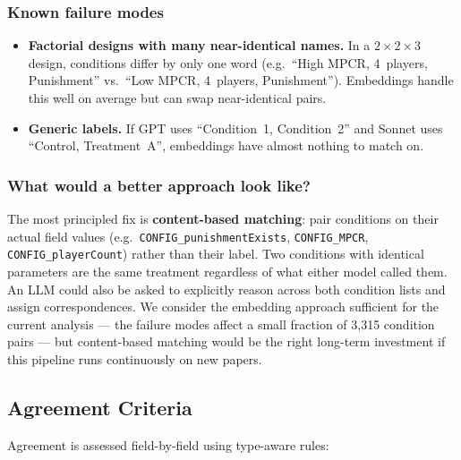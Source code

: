 \documentclass[11pt,a4paper]{article}
\begin{document}
\subsubsection*{Known failure modes}
\begin{itemize}
  \item \textbf{Factorial designs with many near-identical names.}
    In a $2{\times}2{\times}3$ design, conditions differ by only one word
    (e.g.\ ``High MPCR, 4~players, Punishment'' vs.\
    ``Low MPCR, 4~players, Punishment'').
    Embeddings handle this well on average but can swap near-identical pairs.
  \item \textbf{Generic labels.}
    If GPT uses ``Condition~1, Condition~2'' and Sonnet uses
    ``Control, Treatment~A'', embeddings have almost nothing to match on.
\end{itemize}

\subsubsection*{What would a better approach look like?}
The most principled fix is \textbf{content-based matching}: pair conditions
on their actual field values (e.g.\ \texttt{CONFIG\_punishmentExists},
\texttt{CONFIG\_MPCR}, \texttt{CONFIG\_playerCount}) rather than their
label.  Two conditions with identical parameters are the same treatment
regardless of what either model called them.  An LLM could also be asked
to explicitly reason across both condition lists and assign correspondences.
We consider the embedding approach sufficient for the current analysis ---
the failure modes affect a small fraction of 3{,}315 condition pairs --- but
content-based matching would be the right long-term investment if this
pipeline runs continuously on new papers.

\subsection{Agreement Criteria}
Agreement is assessed field-by-field using type-aware rules:
\end{document}
